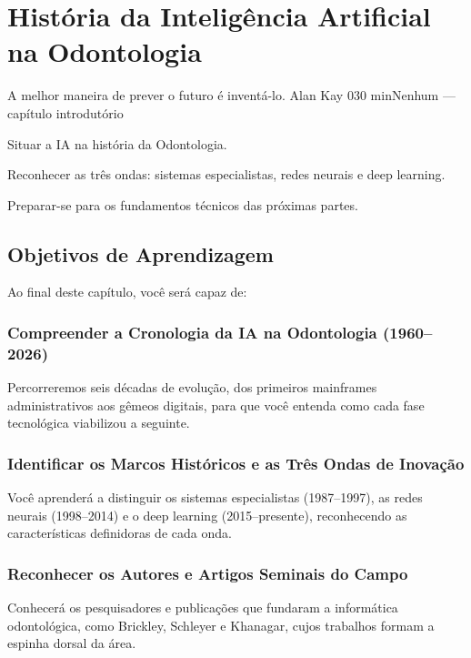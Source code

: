 
\chapter{História da Inteligência Artificial na Odontologia}
\label{cap:historia-ia}

\aberturacap
  {A melhor maneira de prever o futuro é inventá-lo.}
  {Alan Kay}
  {0}{30 min}{Nenhum — capítulo introdutório}
  {\item Situar a IA na história da Odontologia.
   \item Reconhecer as três ondas: sistemas especialistas, redes neurais e deep learning.
   \item Preparar-se para os fundamentos técnicos das próximas partes.}


\section{Objetivos de Aprendizagem}

Ao final deste capítulo, você será capaz de:

\subsection{Compreender a Cronologia da IA na Odontologia (1960--2026)}
Percorreremos seis décadas de evolução, dos primeiros mainframes administrativos aos gêmeos digitais, para que você entenda como cada fase tecnológica viabilizou a seguinte.

\subsection{Identificar os Marcos Históricos e as Três Ondas de Inovação}
Você aprenderá a distinguir os sistemas especialistas (1987--1997), as redes neurais (1998--2014) e o deep learning (2015--presente), reconhecendo as características definidoras de cada onda.

\subsection{Reconhecer os Autores e Artigos Seminais do Campo}
Conhecerá os pesquisadores e publicações que fundaram a informática odontológica, como Brickley, Schleyer e Khanagar, cujos trabalhos formam a espinha dorsal da área.

